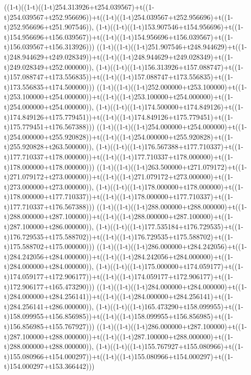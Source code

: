 ((1-t)((1-t)((1-t)254.313926+t254.039567)+t((1-t)254.039567+t252.956696))+t((1-t)((1-t)254.039567+t252.956696)+t((1-t)252.956696+t251.907546)),                                     (1-t)((1-t)((1-t)153.907546+t154.956696)+t((1-t)154.956696+t156.039567))+t((1-t)((1-t)154.956696+t156.039567)+t((1-t)156.039567+t156.313926)))
((1-t)((1-t)((1-t)251.907546+t248.944629)+t((1-t)248.944629+t249.028349))+t((1-t)((1-t)248.944629+t249.028349)+t((1-t)249.028349+t252.000000)),                                     (1-t)((1-t)((1-t)156.313926+t157.088747)+t((1-t)157.088747+t173.556835))+t((1-t)((1-t)157.088747+t173.556835)+t((1-t)173.556835+t174.500000)))
((1-t)((1-t)((1-t)252.000000+t253.100000)+t((1-t)253.100000+t254.000000))+t((1-t)((1-t)253.100000+t254.000000)+t((1-t)254.000000+t254.000000)),                                     (1-t)((1-t)((1-t)174.500000+t174.849126)+t((1-t)174.849126+t175.779451))+t((1-t)((1-t)174.849126+t175.779451)+t((1-t)175.779451+t176.567388)))
((1-t)((1-t)((1-t)254.000000+t254.000000)+t((1-t)254.000000+t255.920828))+t((1-t)((1-t)254.000000+t255.920828)+t((1-t)255.920828+t263.500000)),                                     (1-t)((1-t)((1-t)176.567388+t177.710337)+t((1-t)177.710337+t178.000000))+t((1-t)((1-t)177.710337+t178.000000)+t((1-t)178.000000+t178.000000)))
((1-t)((1-t)((1-t)263.500000+t271.079172)+t((1-t)271.079172+t273.000000))+t((1-t)((1-t)271.079172+t273.000000)+t((1-t)273.000000+t273.000000)),                                     (1-t)((1-t)((1-t)178.000000+t178.000000)+t((1-t)178.000000+t177.710337))+t((1-t)((1-t)178.000000+t177.710337)+t((1-t)177.710337+t176.567388)))
((1-t)((1-t)((1-t)288.000000+t288.000000)+t((1-t)288.000000+t287.100000))+t((1-t)((1-t)288.000000+t287.100000)+t((1-t)287.100000+t286.000000)),                                     (1-t)((1-t)((1-t)177.535184+t176.729535)+t((1-t)176.729535+t175.588702))+t((1-t)((1-t)176.729535+t175.588702)+t((1-t)175.588702+t175.000000)))
((1-t)((1-t)((1-t)286.000000+t284.242056)+t((1-t)284.242056+t284.000000))+t((1-t)((1-t)284.242056+t284.000000)+t((1-t)284.000000+t284.000000)),                                     (1-t)((1-t)((1-t)175.000000+t174.059177)+t((1-t)174.059177+t172.906177))+t((1-t)((1-t)174.059177+t172.906177)+t((1-t)172.906177+t165.473290)))
((1-t)((1-t)((1-t)284.000000+t284.000000)+t((1-t)284.000000+t284.256141))+t((1-t)((1-t)284.000000+t284.256141)+t((1-t)284.256141+t286.000000)),                                     (1-t)((1-t)((1-t)165.473290+t158.099955)+t((1-t)158.099955+t156.856985))+t((1-t)((1-t)158.099955+t156.856985)+t((1-t)156.856985+t155.767927)))
((1-t)((1-t)((1-t)286.000000+t287.100000)+t((1-t)287.100000+t288.000000))+t((1-t)((1-t)287.100000+t288.000000)+t((1-t)288.000000+t288.000000)),                                     (1-t)((1-t)((1-t)155.767927+t155.080966)+t((1-t)155.080966+t154.000297))+t((1-t)((1-t)155.080966+t154.000297)+t((1-t)154.000297+t153.366442)))
